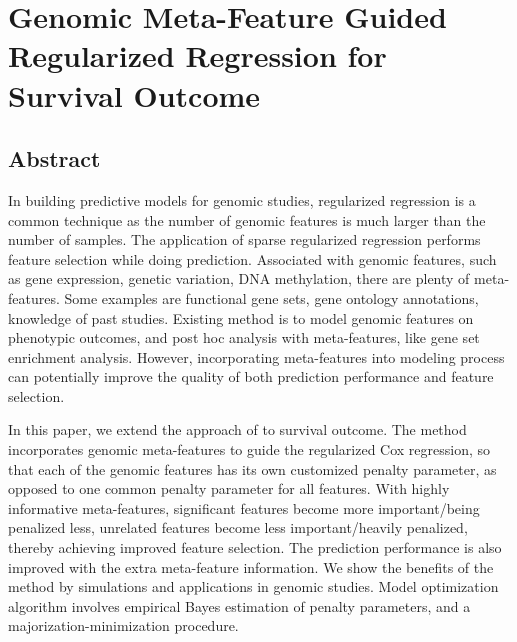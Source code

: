 \chapter{Genomic Meta-Feature Guided Regularized Regression for Survival Outcome}
\label{cha:xtunecox}

\section{Abstract}
In building predictive models for genomic studies, regularized regression is a common technique as the number of genomic features is much larger than the number of samples. The application of sparse regularized regression performs feature selection while doing prediction. Associated with genomic features, such as gene expression, genetic variation, DNA methylation, there are plenty of meta-features. Some examples are functional gene sets, gene ontology annotations, knowledge of past studies. Existing method is to model genomic features on phenotypic outcomes, and post hoc analysis with meta-features, like gene set enrichment analysis. However, incorporating meta-features into modeling process can potentially improve the quality of both prediction performance and feature selection. 

In this paper, we extend the approach of \cite{zeng2021incorporating} to survival outcome. The method incorporates genomic meta-features to guide the regularized Cox regression, so that each of the genomic features has its own customized penalty parameter, as opposed to one common penalty parameter for all features. With highly informative meta-features, significant features become more important/being penalized less, unrelated features become less important/heavily penalized, thereby achieving improved feature selection. The prediction performance is also improved with the extra meta-feature information. We show the benefits of the method by simulations and applications in genomic studies. Model optimization algorithm involves empirical Bayes estimation of penalty parameters, and a majorization-minimization procedure. 

